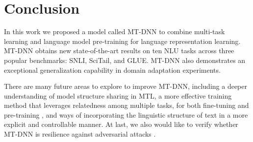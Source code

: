 \section{Conclusion}
\label{sec:con}
In this work we proposed a model called MT-DNN to combine multi-task learning and language model pre-training for language representation learning. 
MT-DNN obtains new state-of-the-art results on ten NLU tasks across three popular benchmarks: SNLI, SciTail, and GLUE.
MT-DNN also demonstrates an exceptional generalization capability in domain adaptation experiments. 

There are many future areas to explore to improve MT-DNN, including a deeper understanding of model structure sharing in MTL, a more effective training method that leverages relatedness among multiple tasks, for both fine-tuning and pre-training \cite{unilm2019}, and ways of incorporating the linguistic structure of text in a more explicit and controllable manner. At last, we also would like to verify whether MT-DNN is resilience against adversarial attacks \cite{breaknli2019acl,talman2018testing,liu2019mt-dnn-kd}.


